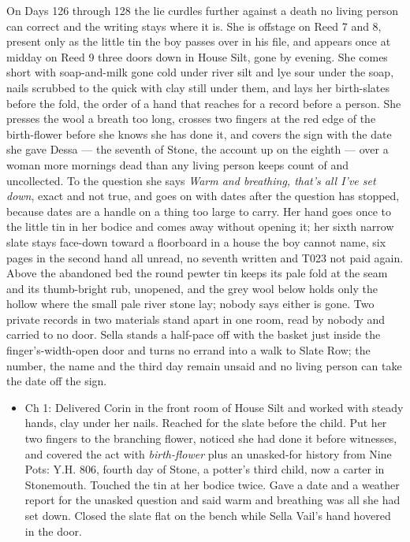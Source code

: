 \documentclass{design/chronicle}
\begin{document}
{On Days 126 through 128 the lie curdles further against a death no living person can correct and the writing stays where it is. She is offstage on Reed 7 and 8, present only as the little tin the boy passes over in his file, and appears once at midday on Reed 9 three doors down in House Silt, gone by evening. She comes short with soap-and-milk gone cold under river silt and lye sour under the soap, nails scrubbed to the quick with clay still under them, and lays her birth-slates before the fold, the order of a hand that reaches for a record before a person. She presses the wool a breath too long, crosses two fingers at the red edge of the birth-flower before she knows she has done it, and covers the sign with the date she gave Dessa — the seventh of Stone, the account up on the eighth — over a woman more mornings dead than any living person keeps count of and uncollected. To the question she says \emph{Warm and breathing, that’s all I’ve set down}, exact and not true, and goes on with dates after the question has stopped, because dates are a handle on a thing too large to carry. Her hand goes once to the little tin in her bodice and comes away without opening it; her sixth narrow slate stays face-down toward a floorboard in a house the boy cannot name, six pages in the second hand all unread, no seventh written and T023 not paid again. Above the abandoned bed the round pewter tin keeps its pale fold at the seam and its thumb-bright rub, unopened, and the grey wool below holds only the hollow where the small pale river stone lay; nobody says either is gone. Two private records in two materials stand apart in one room, read by nobody and carried to no door. Sella stands a half-pace off with the basket just inside the finger’s-width-open door and turns no errand into a walk to Slate Row; the number, the name and the third day remain unsaid and no living person can take the date off the sign.

\begin{itemize}[leftmargin=1.4em,itemsep=1pt,topsep=3pt,parsep=0pt]

\item Ch 1: Delivered Corin in the front room of House Silt and worked with steady hands, clay under her nails. Reached for the slate before the child. Put her two fingers to the branching flower, noticed she had done it before witnesses, and covered the act with \emph{birth-flower} plus an unasked-for history from Nine Pots: Y.H. 806, fourth day of Stone, a potter’s third child, now a carter in Stonemouth. Touched the tin at her bodice twice. Gave a date and a weather report for the unasked question and said warm and breathing was all she had set down. Closed the slate flat on the bench while Sella Vail’s hand hovered in the door.


\end{itemize}}
\end{document}
